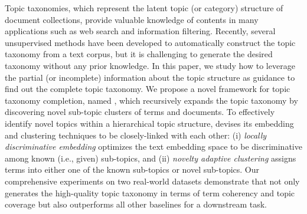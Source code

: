 Topic taxonomies, which represent the latent topic (or category) structure of document collections, provide valuable knowledge of contents in many applications such as web search and information filtering.
Recently, several unsupervised methods have been developed to automatically construct the topic taxonomy from a text corpus, but it is challenging to generate the desired taxonomy without any prior knowledge.
In this paper, we study how to leverage the partial (or incomplete) information about the topic structure as guidance to find out the complete topic taxonomy.
We propose a novel framework for topic taxonomy completion, named \proposed, which recursively expands the topic taxonomy by discovering novel sub-topic clusters of terms and documents.
To effectively identify novel topics within a hierarchical topic structure, \proposed devises its embedding and clustering techniques to be closely-linked with each other:
(i) \textit{locally discriminative embedding} optimizes the text embedding space to be discriminative among known (i.e., given) sub-topics, and (ii) \textit{novelty adaptive clustering} assigns terms into either one of the known sub-topics or novel sub-topics.
Our comprehensive experiments on two real-world datasets demonstrate that \proposed not only generates the high-quality topic taxonomy in terms of term coherency and topic coverage but also outperforms all other baselines for a downstream task.